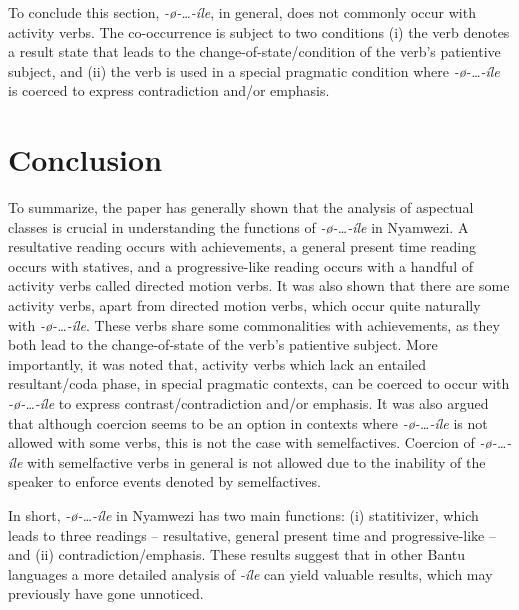 \documentclass[output=paper]{langscibook}
\begin{document}
To conclude this section, \textit{-ø}\textit{-…-íle}, in general, does not commonly occur with activity verbs. The co-occurrence is subject to two conditions (i) the verb denotes a result state that leads to the change-of-state/condition of the verb’s patientive subject, and (ii) the verb is used in a special pragmatic condition where \textit{-ø}\textit{-…-íle} is coerced to express contradiction and/or emphasis.

\section{Conclusion}

\label{sec:kanijo:5}

To summarize, the paper has generally shown that the analysis of aspectual classes is crucial in understanding the functions of \textit{-ø}\textit{-…-íle} in Nyamwezi. A resultative reading occurs with achievements, a general present time reading occurs with statives, and a progressive-like reading occurs with a handful of activity verbs called directed motion verbs. It was also shown that there are some activity verbs, apart from directed motion verbs, which occur quite naturally with \textit{-ø}\textit{-…-íle}. These verbs share some commonalities with achievements, as they both lead to the change-of-state of the verb’s patientive subject. More importantly, it was noted that, activity verbs which lack an entailed resultant/coda phase, in special pragmatic contexts, can be coerced to occur with \textit{-ø}\textit{-…-íle} to express contrast/contradiction and/or emphasis. It was also argued that although coercion seems to be an option in contexts where \textit{-ø}\textit{-…-íle} is not allowed with some verbs, this is not the case with semelfactives. Coercion of \textit{-ø}\textit{-…-íle} with semelfactive verbs in general is not allowed due to the inability of the speaker to enforce events denoted by semelfactives. 

In short, \textit{-ø}\textit{-…-íle} in Nyamwezi has two main functions: (i) statitivizer, which leads to three readings -- resultative, general present time and progressive-like -- and (ii) contradiction/emphasis. These results suggest that in other Bantu languages a more detailed analysis of \textit{-íle} can yield valuable results, which may previously have gone unnoticed.  

\end{document}
